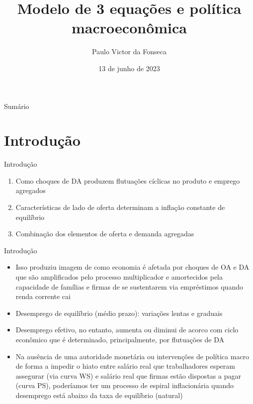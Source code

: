 \documentclass[10pt]{beamer}
\title[]{Modelo de 3 equações e política macroeconômica}
\author[]{Paulo Victor da Fonseca}
\date{13 de junho de 2023}
\begin{document}
\begin{frame}[plain]
\end{frame}

\begin{frame}{Sumário}
    \tableofcontents
\end{frame}

\section{Introdução}
\begin{frame}
    {Introdução}
    \begin{enumerate}
        \item Como choques de DA produzem flutuações cíclicas no produto e emprego agregados\bigskip
        \item Características de lado de oferta determinam a inflação constante de equilíbrio\bigskip
        \item Combinação dos elementos de oferta e demanda agregadas
    \end{enumerate}
\end{frame}

\begin{frame}
    {Introdução}
    \begin{itemize}
        \item Isso produziu imagem de como economia é afetada por choques de OA e DA que são amplificados pelo processo multiplicador e amortecidos pela capacidade de famílias e firmas de se sustentarem via empréstimos quando renda corrente cai\bigskip
        \item Desemprego de equilíbrio (médio prazo): variações lentas e graduais\bigskip
        \item Desemprego efetivo, no entanto, aumenta ou diminui de acorco com ciclo econômico que é determinado, principalmente, por flutuações de DA\bigskip
        \item Na ausência de uma autoridade monetária ou intervenções de política macro de forma a impedir o hiato entre salário real que trabalhadores esperam assegurar (via curva WS) e salário real que firmas estão dispostas a pagar (curva PS), poderíamos ter um processo de espiral inflacionária quando desemprego está abaixo da taxa de equilíbrio (natural)
    \end{itemize}
\end{frame}
\end{document}
